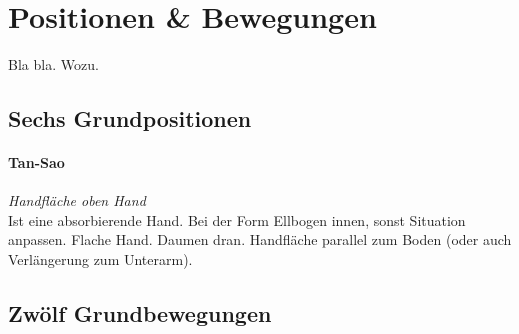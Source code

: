 \newenvironment{WTPosition}[2]
	{
		\subsubsection{#1}
		\textit{#2}
		\\
	}
	{}
	

\renewcommand\chapterillustration{six-computers-chips-circuits}
\chapter{Positionen \& Bewegungen}



Bla bla. Wozu.


\newpage



\section{Sechs Grundpositionen}

\begin{WTPosition}{Tan-Sao}{Handfl\"ache oben Hand}
	
	Ist eine absorbierende Hand. Bei der Form Ellbogen innen, sonst Situation anpassen. Flache Hand. Daumen dran. Handfl\"ache parallel zum Boden (oder auch Verl\"angerung zum Unterarm).
	
\end{WTPosition}


\section{Zw\"olf Grundbewegungen}

%

